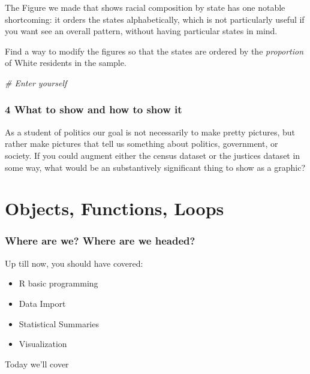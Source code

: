 \documentclass[]{book}
\newenvironment{Shaded}{\begin{snugshade}}{\end{snugshade}}
\newcommand{\CommentTok}[1]{\textcolor[rgb]{0.56,0.35,0.01}{\textit{#1}}}
\providecommand{\tightlist}{%
  \setlength{\itemsep}{0pt}\setlength{\parskip}{0pt}}
\theoremstyle{definition}
\theoremstyle{definition}
\theoremstyle{definition}
\theoremstyle{remark}
\begin{document}
The Figure we made that shows racial composition by state has one
notable shortcoming: it orders the states alphabetically, which is not
particularly useful if you want see an overall pattern, without having
particular states in mind.

Find a way to modify the figures so that the states are ordered by the
\emph{proportion} of White residents in the sample.

\begin{Shaded}
\begin{Highlighting}[]
\CommentTok{# Enter yourself}
\end{Highlighting}
\end{Shaded}

\subsection*{4 What to show and how to show
it}\label{what-to-show-and-how-to-show-it}

As a student of politics our goal is not necessarily to make pretty
pictures, but rather make pictures that tell us something about
politics, government, or society. If you could augment either the census
dataset or the justices dataset in some way, what would be an
substantively significant thing to show as a graphic?

\chapter{Objects, Functions, Loops}\label{robjloops}

\subsection*{Where are we? Where are we
headed?}\label{where-are-we-where-are-we-headed-3}

Up till now, you should have covered:

\begin{itemize}
\tightlist
\item
  R basic programming
\item
  Data Import
\item
  Statistical Summaries
\item
  Visualization
\end{itemize}

Today we'll cover
\end{document}
